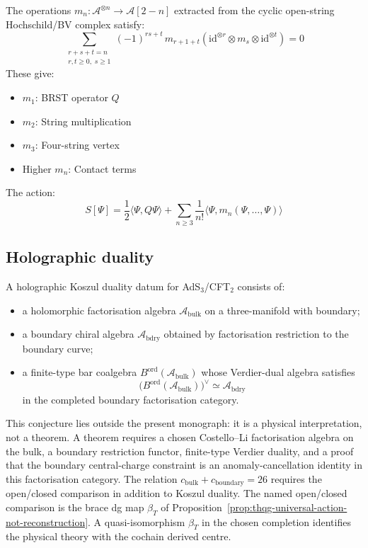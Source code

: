 \begin{theorem}\label{thm:string-field-theory-hochschild}
The operations
$m_n: \mathcal{A}^{\otimes n} \to \mathcal{A}[2-n]$
extracted from the cyclic open-string Hochschild/BV complex satisfy:
\[
\sum_{\substack{r+s+t=n \\ r,t \geq 0,\; s \geq 1}} (-1)^{rs+t}\, m_{r+1+t}(\mathrm{id}^{\otimes r} \otimes m_s \otimes \mathrm{id}^{\otimes t}) = 0
\]
These give:
\begin{itemize}
\item $m_1$: BRST operator $Q$
\item $m_2$: String multiplication
\item $m_3$: Four-string vertex
\item Higher $m_n$: Contact terms
\end{itemize}
\end{theorem}

The action:
\[
S[\Psi] = \frac{1}{2}\langle \Psi, Q\Psi \rangle + \sum_{n \geq 3} \frac{1}{n!}\langle \Psi, m_n(\Psi,\ldots,\Psi)\rangle
\]

\subsection{Holographic duality}

\begin{conjecture}
\label{conj:holographic-koszul-deformation}
A holographic Koszul duality datum for AdS$_3$/CFT$_2$ consists of:
\begin{itemize}
\item a holomorphic factorisation algebra
 $\mathcal{A}_{\mathrm{bulk}}$ on a three-manifold with boundary;
\item a boundary chiral algebra
 $\mathcal{A}_{\mathrm{bdry}}$ obtained by factorisation restriction
 to the boundary curve;
\item a finite-type bar coalgebra
 $B^{\mathrm{ord}}(\mathcal{A}_{\mathrm{bulk}})$ whose Verdier-dual
 algebra satisfies
 \[
   \bigl(B^{\mathrm{ord}}(\mathcal{A}_{\mathrm{bulk}})\bigr)^\vee
   \simeq \mathcal{A}_{\mathrm{bdry}}
 \]
 in the completed boundary factorisation category.
\end{itemize}
\end{conjecture}

\begin{remark}[Scope]
This conjecture lies outside the present monograph: it is a physical
interpretation, not a theorem. A theorem requires a chosen
Costello--Li factorisation algebra on the bulk, a boundary restriction
functor, finite-type Verdier duality, and a proof that the boundary
central-charge constraint is an anomaly-cancellation identity in this
factorisation category. The relation
$c_{\text{bulk}}+c_{\text{boundary}}=26$ requires the open/closed
comparison in addition to Koszul duality.
The named open/closed comparison is the brace dg map
$\beta_T$ of
Proposition~\ref{prop:thqg-universal-action-not-reconstruction}.  A
quasi-isomorphism $\beta_T$ in the chosen completion identifies the
physical theory with the cochain derived centre.
\end{remark}

